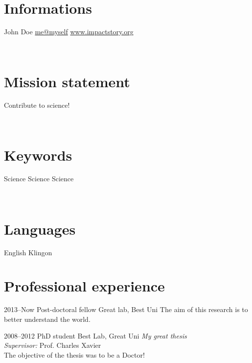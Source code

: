 \documentclass[]{friggeri-cv} %
\begin{document}



\thispagestyle{first}

\begin{aside} 
~\vspace{45pt}


\section{Informations}
John Doe
\href{mailto:me@myself}{me@myself}
\href{http://www.impactstory.org}{www.impactstory.org}

~\vspace{10pt}

\section{Mission statement}
Contribute to science!

~\vspace{10pt}

\section{Keywords}
Science
Science
Science

~\vspace{10pt}

\section{Languages}
English {\color{light}}
Klingon {\color{light}}

\end{aside}




\section{Professional experience}

\begin{entrylist}
\entry
{2013--Now}
{Post-doctoral fellow}
{Great lab, Best Uni}
{The aim of this research is to better understand the world.\\}

\entry
{2008--2012}
{PhD student}
{Best Lab, Great Uni}
{
\emph{My great thesis}\\
\emph{Supervisor:} Prof. Charles Xavier\\
The objective of the thesis was to be a Doctor!
}

\end{entrylist}
\end{document}
